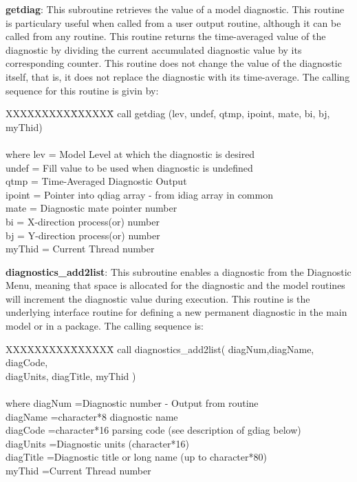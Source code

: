 \noindent
{\bf getdiag}:  This subroutine retrieves the value of a model diagnostic.  This routine 
is particulary useful when called from a user output routine, although it can be called 
from any routine.  This routine returns the time-averaged value of the diagnostic by
dividing the current accumulated diagnostic value by its corresponding counter.  This 
routine does not change the value of the diagnostic itself, that is, it does not replace 
the diagnostic with its time-average.  The calling sequence for this routine is givin by:

\noindent
\begin{tabbing}
XXXXXXXXX\=XXXXXX\= \kill
\>        call getdiag (lev, undef, qtmp, ipoint, mate, bi, bj, myThid) \\
\\
where \>  lev     \>= Model Level at which the diagnostic is desired \\
      \>  undef   \>= Fill value to be used when diagnostic is undefined \\
      \>  qtmp    \>= Time-Averaged Diagnostic Output \\
      \>  ipoint  \>= Pointer into qdiag array - from idiag array in common \\
      \>  mate    \>= Diagnostic mate pointer number \\
      \>  bi      \>= X-direction process(or) number \\
      \>  bj      \>= Y-direction process(or) number \\
      \>  myThid  \>= Current Thread number \\
\end{tabbing}

\noindent
{\bf diagnostics\_add2list}:  This subroutine enables a diagnostic from the Diagnostic Menu, meaning 
that space is allocated for the diagnostic and the model routines will increment the 
diagnostic value during execution.  This routine is the underlying interface routine
for defining a new permanent diagnostic in the main model or in a package.  The calling sequence is:

\noindent
\begin{tabbing}
XXXXXXXXX\=XXXXXX\= \kill
\>        call diagnostics\_add2list( diagNum,diagName, diagCode, \\
\>        diagUnits, diagTitle, myThid ) \\
\\
where \> diagNum   \>=Diagnostic number - Output from routine \\
      \> diagName  \>=character*8 diagnostic name \\
      \> diagCode  \>=character*16 parsing code (see description of gdiag below) \\
      \> diagUnits \>=Diagnostic units (character*16) \\
      \> diagTitle \>=Diagnostic title or long name (up to character*80) \\
      \> myThid    \>=Current Thread number \\
\end{tabbing}


